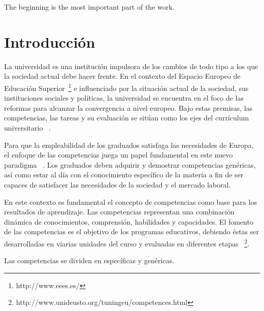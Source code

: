 



\begin{savequote}[50mm]
The beginning is the most important part of the work. 
\end{savequote}

\chapter{Introducción}
\label{cha:Introduction}

\ifpdf
    \graphicspath{{1_introduction/figures/PNG/}{1_introduction/figures/PDF/}{1_introduction/figures/}}
\else
    \graphicspath{{1_introduction/figures/EPS/}{1_introduction/figures/}}
\fi



La universidad es una institución impulsora de los cambios de todo tipo a los que la sociedad actual debe hacer frente. En el contexto del Espacio Europeo de Educación Superior~\footnote{http://www.eees.es/} e influenciado por la situación  actual de  la sociedad, sus instituciones sociales y políticas, la universidad se encuentra en el foco de las reformas para alcanzar la convergencia a nivel europeo. Bajo estas premisas, las competencias, las tareas y su evaluación se sitúan como los ejes del currículum universitario ~\cite{zabala2005espacio}.

Para que la empleabilidad de los graduados satisfaga las necesidades de Europa, el enfoque de las competencias juega un papel fundamental en este nuevo paradigma  ~\cite{communique2012making}. Los graduados deben adquirir y demostrar competencias genéricas, así como estar al día con el conocimiento específico de la materia a fin de ser capaces de satisfacer las necesidades de la sociedad y el mercado laboral.

En este contexto es fundamental el concepto de competencias como base para los resultados de aprendizaje. Las competencias representan una combinación dinámica de conocimientos, comprensión, habilidades y capacidades. El fomento de las competencias es el objetivo de los programas educativos, debiendo éstas ser desarrolladas en viarias unidades del curso y evaluadas en diferentes etapas ~\footnote{http://www.unideusto.org/tuningeu/competences.html}.

Las competencias se dividen en específicas y genéricas.







